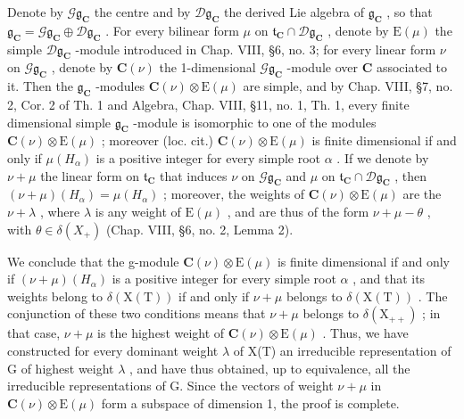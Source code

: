 Denote by \(\mathcal{G}\mathfrak{g}_{\mathbf{C}}\) the centre and by \(\mathcal{D}\mathfrak{g}_{\mathbf{C}}\) the derived Lie algebra of \(\mathfrak{g}_{\mathbf{C}}\) , so that \(\mathfrak{g}_{\mathbf{C}} = \mathcal{G}\mathfrak{g}_{\mathbf{C}} \oplus \mathcal{D}\mathfrak{g}_{\mathbf{C}}\) . For every bilinear form \(\mu\) on \(\mathfrak{t}_{\mathbf{C}} \cap \mathcal{D}\mathfrak{g}_{\mathbf{C}}\) , denote by \(\mathrm{E}(\mu)\) the simple \(\mathcal{D}\mathfrak{g}_{\mathbf{C}}\) -module introduced in Chap. VIII, §6, no. 3; for every linear form \(\nu\) on \(\mathcal{G}\mathfrak{g}_{\mathbf{C}}\) , denote by \(\mathbf{C}(\nu)\) the 1-dimensional \(\mathcal{G}\mathfrak{g}_{\mathbf{C}}\) -module over \(\mathbf{C}\) associated to it. Then the \(\mathfrak{g}_{\mathbf{C}}\) -modules \(\mathbf{C}(\nu) \otimes \mathrm{E}(\mu)\) are simple, and by Chap. VIII, §7, no. 2, Cor. 2 of Th. 1 and Algebra, Chap. VIII, §11, no. 1, Th. 1, every finite dimensional simple \(\mathfrak{g}_{\mathbf{C}}\) -module is isomorphic to one of the modules \(\mathbf{C}(\nu) \otimes \mathrm{E}(\mu)\) ; moreover (loc. cit.) \(\mathbf{C}(\nu) \otimes \mathrm{E}(\mu)\) is finite dimensional if and only if \(\mu(H_{\alpha})\) is a positive integer for every simple root \(\alpha\) . If we denote by \(\nu + \mu\) the linear form on \(\mathfrak{t}_{\mathbf{C}}\) that induces \(\nu\) on \(\mathcal{G}\mathfrak{g}_{\mathbf{C}}\) and \(\mu\) on \(\mathfrak{t}_{\mathbf{C}} \cap \mathcal{D}\mathfrak{g}_{\mathbf{C}}\) , then \((\nu + \mu)(H_{\alpha}) = \mu(H_{\alpha})\) ; moreover, the weights of \(\mathbf{C}(\nu) \otimes \mathrm{E}(\mu)\) are the \(\nu + \lambda\) , where \(\lambda\) is any weight of \(\mathrm{E}(\mu)\) , and are thus of the form \(\nu + \mu - \theta\) , with \(\theta \in \delta(X_{+})\) (Chap. VIII, §6, no. 2, Lemma 2).

We conclude that the g-module \(\mathbf{C}(\nu)\otimes\mathrm{E}(\mu)\) is finite dimensional if and only if \((\nu+\mu)(H_{\alpha})\) is a positive integer for every simple root \(\alpha\) , and that its weights belong to \(\delta(\mathrm{X}(\mathrm{T}))\) if and only if \(\nu+\mu\) belongs to \(\delta(\mathrm{X}(\mathrm{T}))\) . The conjunction of these two conditions means that \(\nu+\mu\) belongs to \(\delta(\mathrm{X}_{++})\) ; in that case, \(\nu+\mu\) is the highest weight of \(\mathbf{C}(\nu)\otimes\mathrm{E}(\mu)\) . Thus, we have constructed for every dominant weight \(\lambda\) of X(T) an irreducible representation of G of highest weight \(\lambda\) , and have thus obtained, up to equivalence, all the irreducible representations of G. Since the vectors of weight \(\nu+\mu\) in \(\mathbf{C}(\nu)\otimes\mathrm{E}(\mu)\) form a subspace of dimension 1, the proof is complete.

